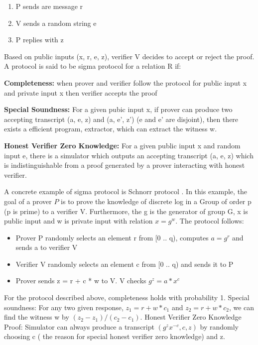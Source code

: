 {{     \begin{enumerate}
     \item P sends are message r
     \item V sends a random string e
     \item P replies with z
     \end{enumerate}
     
     Based on public inputs (x, r, e, z), verifier V decides to accept or reject the proof.   A protocol is 
     said to be sigma protocol for a relation R if: 
     
     \textbf{Completeness:} when prover and verifier follow the protocol for public input x and private input x 
          then verifier accepts the proof
          
      \textbf{Special Soundness:} For a given pubic input x, if prover can produce two accepting transcript (a, e, z) 
      and (a, e', z') (e and e' are disjoint), then there exists a efficient program, extractor, which can extract the 
      witness w.
      
      \textbf{Honest Verifier Zero Knowledge:} For a given public input x and random input e, there is a simulator 
      which outputs an accepting transcript (a, e, z) which is indistinguishable from a proof generated by 
      a prover interacting with honest verifier. 
     
     A concrete example of sigma protocol is Schnorr protocol \citep{10.1007/3-540-48658-5_19}. In this example, 
     the goal of a prover $P$ is
     to prove the knowledge of discrete log in a Group of order p (p is prime) to a verifier V.
     Furthermore, the g is the generator of 
     group G, x is public input and w is private input with relation $x = g^w$. The protocol follows:
     
     \begin{itemize}
     \item Prover P randomly selects an element r from [0 .. q), computes $a = g^r$ and sends a to verifier V
     \item Verifier V randomly selects an element c from [0 .. q) and sends it to P
     \item Prover sends z = r + c * w to V.  V checks $g^z = a * x^c$
     \end{itemize}
     
     For the protocol described above, completeness holds with probability 1.  Special soundness: For any two given response, 
     $z_{1} = r + w * c_{1}$ and  $z_{2} = r + w * c_{2}$, we can find the witness w by  $(z_{2} - z_{1})/(c_{2} - c_{1})$.  
     Honest Verifier Zero Knowledge Proof: Simulator can always produce a transcript $(g^{z} x^{-c}, c, z)$ by randomly choosing c (
     the reason for special honest verifier zero knowledge) and z.
     
}}

